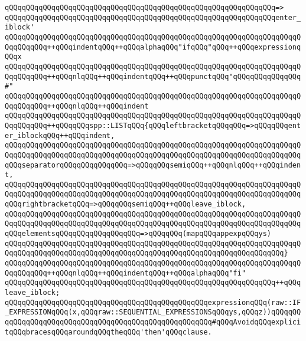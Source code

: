 \verb|qQQqqQQqqQQqqQQqqQQqqQQqqQQqqQQqqQQqqQQqqQQqqQQqqQQqqQQqqQQqqQQq=>|\newline
\verb|qQQqqQQqqQQqqQQqqQQqqQQqqQQqqQQqqQQqqQQqqQQqqQQqqQQqqQQqqQQqqQQqenter_iblock'|\newline
\verb|qQQqqQQqqQQqqQQqqQQqqQQqqQQqqQQqqQQqqQQqqQQqqQQqqQQqqQQqqQQqqQQqqQQqqQQqqQQqqQQq++qQQqindentqQQq++qQQqalphaqQQq"ifqQQq"qQQq++qQQqexpressionqQQqx|\newline
\verb|qQQqqQQqqQQqqQQqqQQqqQQqqQQqqQQqqQQqqQQqqQQqqQQqqQQqqQQqqQQqqQQqqQQqqQQqqQQqqQQq++qQQqnlqQQq++qQQqindentqQQq++qQQqpunctqQQq"qQQqqQQqqQQqqQQq#"|\newline
\verb|qQQqqQQqqQQqqQQqqQQqqQQqqQQqqQQqqQQqqQQqqQQqqQQqqQQqqQQqqQQqqQQqqQQqqQQqqQQqqQQq++qQQqnlqQQq++qQQqindent|\newline
\verb|qQQqqQQqqQQqqQQqqQQqqQQqqQQqqQQqqQQqqQQqqQQqqQQqqQQqqQQqqQQqqQQqqQQqqQQqqQQqqQQq++qQQqqQQqspp::LISTqQQq{qQQqleftbracketqQQqqQQq=>qQQqqQQqenter_iblockqQQq++qQQqindent,|\newline
\verb|qQQqqQQqqQQqqQQqqQQqqQQqqQQqqQQqqQQqqQQqqQQqqQQqqQQqqQQqqQQqqQQqqQQqqQQqqQQqqQQqqQQqqQQqqQQqqQQqqQQqqQQqqQQqqQQqqQQqqQQqqQQqqQQqqQQqqQQqqQQqqQQqseparatorqQQqqQQqqQQqqQQq=>qQQqqQQqsemiqQQq++qQQqnlqQQq++qQQqindent,|\newline
\verb|qQQqqQQqqQQqqQQqqQQqqQQqqQQqqQQqqQQqqQQqqQQqqQQqqQQqqQQqqQQqqQQqqQQqqQQqqQQqqQQqqQQqqQQqqQQqqQQqqQQqqQQqqQQqqQQqqQQqqQQqqQQqqQQqqQQqqQQqqQQqqQQqrightbracketqQQq=>qQQqqQQqsemiqQQq++qQQqleave_iblock,|\newline
\verb|qQQqqQQqqQQqqQQqqQQqqQQqqQQqqQQqqQQqqQQqqQQqqQQqqQQqqQQqqQQqqQQqqQQqqQQqqQQqqQQqqQQqqQQqqQQqqQQqqQQqqQQqqQQqqQQqqQQqqQQqqQQqqQQqqQQqqQQqqQQqqQQqelementsqQQqqQQqqQQqqQQqqQQq=>qQQqqQQq(mapqQQqappexpqQQqys)|\newline
\verb|qQQqqQQqqQQqqQQqqQQqqQQqqQQqqQQqqQQqqQQqqQQqqQQqqQQqqQQqqQQqqQQqqQQqqQQqqQQqqQQqqQQqqQQqqQQqqQQqqQQqqQQqqQQqqQQqqQQqqQQqqQQqqQQqqQQqqQQq}|\newline
\verb|qQQqqQQqqQQqqQQqqQQqqQQqqQQqqQQqqQQqqQQqqQQqqQQqqQQqqQQqqQQqqQQqqQQqqQQqqQQqqQQq++qQQqnlqQQq++qQQqindentqQQq++qQQqalphaqQQq"fi"|\newline
\verb|qQQqqQQqqQQqqQQqqQQqqQQqqQQqqQQqqQQqqQQqqQQqqQQqqQQqqQQqqQQqqQQq++qQQqleave_iblock;|\newline
\newline
\verb|qQQqqQQqqQQqqQQqqQQqqQQqqQQqqQQqqQQqqQQqqQQqqQQqexpressionqQQq(raw::IF_EXPRESSIONqQQq(x,qQQqraw::SEQUENTIAL_EXPRESSIONSqQQqys,qQQqz))qQQqqQQqqQQqqQQqqQQqqQQqqQQqqQQqqQQqqQQqqQQqqQQqqQQqqQQq#qQQqAvoidqQQqexplicitqQQqbracesqQQqaroundqQQqtheqQQq'then'qQQqclause.|\newline
